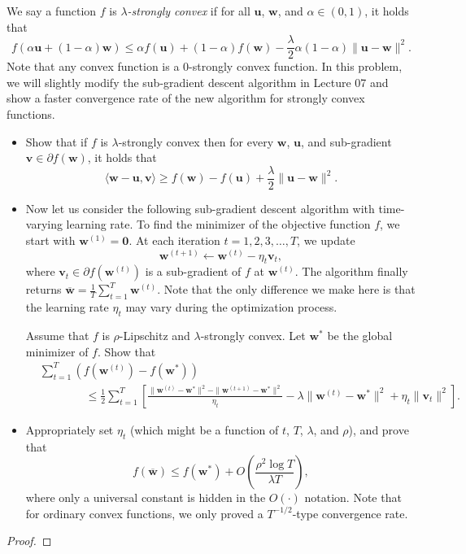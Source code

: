 \documentclass[12pt,letterpaper]{article}
\theoremstyle{definition}
\begin{document}
We say a function $f$ is \emph{$\lambda$-strongly convex} if for all $\bm{u}$, $\bm{w}$, and $\alpha \in (0, 1)$, it holds that 
\[
f(\alpha \bm{u} + (1-\alpha) \bm{w}) \leq \alpha f(\bm{u}) + (1-\alpha) f(\bm{w}) - \frac{\lambda}{2} \alpha (1-\alpha) \|\bm{u} - \bm{w}\|^2 .
\]
Note that any convex function is a $0$-strongly convex function. In this problem, we will slightly modify the sub-gradient descent algorithm in Lecture 07 and show a faster convergence rate of the new algorithm for strongly convex functions.
\begin{itemize}
\item Show that if $f$ is $\lambda$-strongly convex then for every $\bm{w}$, $\bm{u}$, and sub-gradient $\bm{v} \in \partial f(\bm{w})$, it holds that
\[
\langle \bm{w} - \bm{u}, \bm{v} \rangle \geq f(\bm{w}) - f(\bm{u}) + \frac{\lambda}{2} \|\bm{u} - \bm{w}\|^2 .
\]

\item Now let us consider the following sub-gradient descent algorithm with time-varying learning rate. To find the minimizer of the objective function $f$, we start with $\bm{w}^{(1)} = \bm{0}$. At each iteration $t = 1, 2, 3, \dots, T$, we update 
\[
\bm{w}^{(t+1)} \leftarrow \bm{w}^{(t)} - \eta_t \bm{v}_t,
\]
where $\bm{v}_t\in \partial f(\bm{w}^{(t)})$ is a sub-gradient of $f$ at $\bm{w}^{(t)}$. The algorithm finally returns $\overline{\bm{w}} = \frac1T \sum_{t=1}^{T} \bm{w}^{(t)}$. Note that the only difference we make here is that the learning rate $\eta_t$ may vary during the optimization process.

Assume that $f$ is $\rho$-Lipschitz and $\lambda$-strongly convex. Let $\bm{w}^*$ be the global minimizer of $f$. Show that
\begin{align*}
& \sum_{t=1}^{T} (f(\bm{w}^{(t)}) - f(\bm{w}^*)) \\
& \qquad\qquad  \leq \frac12 \sum_{t=1}^{T}\left[ \frac{\|\bm{w}^{(t)} - \bm{w}^{*}\|^2 - \|\bm{w}^{(t+1)} - \bm{w}^{*}\|^2}{\eta_t} - \lambda \|\bm{w}^{(t)} - \bm{w}^{*}\|^2 + \eta_t \|\bm{v}_t\|^2\right] .
\end{align*}


\item Appropriately set $\eta_t$ (which might be a function of $t$, $T$, $\lambda$, and $\rho$), and prove that 
\[
f(\overline{\bm{w}}) \leq f(\bm{w}^*)  + O\left(\frac{\rho^2 \log T}{\lambda T} \right),
\]
where only a universal constant is hidden in the $O(\cdot)$ notation. Note that for ordinary convex functions, we only proved a $T^{-1/2}$-type convergence rate. 
\end{itemize}
\begin{proof}
  
\end{proof}
\end{document}
